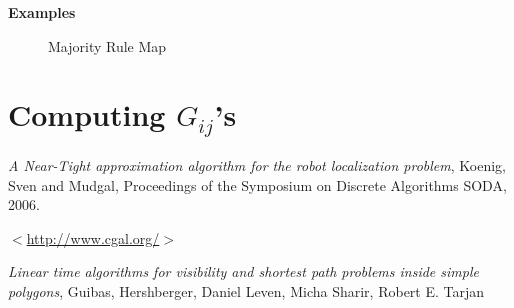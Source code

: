\documentclass[a4paper,10pt]{article}
\begin{document}
{\bf Examples}


\begin{figure}[h]
\begin{center}
\caption{\label{fig:Majority Rule Map}Majority Rule Map}
\end{center}
\end{figure}











\newpage
\section{Computing $G_{ij}$'s}





\newpage

\begin{thebibliography}{1}
 \emph{A Near-Tight approximation algorithm for the robot localization problem},
 Koenig, Sven and Mudgal, Proceedings of the Symposium on Discrete Algorithms SODA, 2006.

 $<$\url{http://www.cgal.org/}$>$

 \emph{Linear time algorithms for visibility and shortest path problems inside simple polygons}, Guibas, 
Hershberger, Daniel Leven, Micha Sharir, Robert E. Tarjan
\end{thebibliography}
\end{document}
